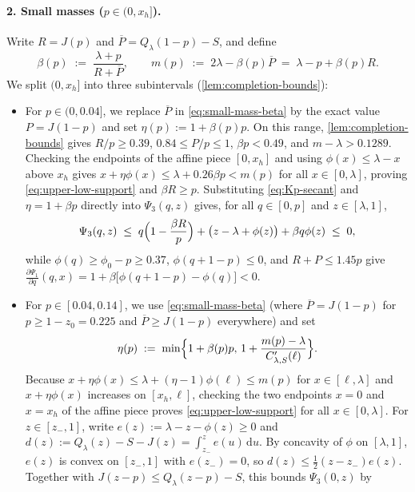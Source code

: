 \documentclass[11pt]{article}
\numberwithin{equation}{section}
\theoremstyle{plain}
\theoremstyle{definition}
\newcommand{\1}{\mathbf{1}}
\begin{document}
\paragraph{2. Small masses ($p \in (0, x_h]$).}
Write $R = J(p)$ and $\overline{P} = Q_\lambda(1 - p) - S$, and define
\begin{equation}
  \beta(p) \;:=\; \frac{\lambda + p}{R + \overline{P}},
  \qquad
  m(p) \;:=\; 2\lambda - \beta(p)\overline{P} \;=\; \lambda - p + \beta(p)R.
  \label{eq:small-mass-beta}
\end{equation}
We split $(0, x_h]$ into three subintervals (\cref{lem:completion-bounds}):
\begin{itemize}
  \item For $p \in (0, 0.04]$, we replace $\overline{P}$ in \cref{eq:small-mass-beta} by the exact value $P = J(1 - p)$ and set $\eta(p) := 1 + \beta(p)p$. On this range, \cref{lem:completion-bounds} gives $R/p \ge 0.39$, $0.84 \le P/p \le 1$, $\beta p < 0.49$, and $m - \lambda > 0.1289$. Checking the endpoints of the affine piece $[0, x_h]$ and using $\phi(x) \le \lambda - x$ above $x_h$ gives $x + \eta\phi(x) \le \lambda + 0.26\beta p < m(p)$ for all $x \in [0, \lambda]$, proving \cref{eq:upper-low-support} and $\beta R \ge p$. Substituting \cref{eq:Kp-secant} and $\eta = 1 + \beta p$ directly into $\Psi_3(q, z)$ gives, for all $q \in [0, p]$ and $z \in [\lambda, 1]$,
  \[
    \Psi_3(q, z) \;\le\; q\Bigl(1 - \frac{\beta R}{p}\Bigr) + \bigl(z - \lambda + \phi(z)\bigr) + \beta q\phi(z) \;\le\; 0,
  \]
  while $\phi(q) \ge \phi_0 - p \ge 0.37$, $\phi(q + 1 - p) \le 0$, and $R + P \le 1.45p$ give $\frac{\partial \Psi_1}{\partial q}(q, x) = 1 + \beta\bigl[\phi(q + 1 - p) - \phi(q)\bigr] < 0$.
  \item For $p \in [0.04, 0.14]$, we use \cref{eq:small-mass-beta} (where $\overline{P} = J(1 - p)$ for $p \ge 1 - z_0 = 0.225$ and $\overline{P} \ge J(1 - p)$ everywhere) and set
  \[
    \eta(p) \;:=\; \min\Bigl\{1 + \beta(p)p,\, 1 + \frac{m(p) - \lambda}{C'_{\lambda, S}(\ell)}\Bigr\}.
  \]
  Because $x + \eta\phi(x) \le \lambda + (\eta - 1)\phi(\ell) \le m(p)$ for $x \in [\ell, \lambda]$ and $x + \eta\phi(x)$ increases on $[x_h, \ell]$, checking the two endpoints $x = 0$ and $x = x_h$ of the affine piece proves \cref{eq:upper-low-support} for all $x \in [0, \lambda]$. For $z \in [z_-, 1]$, write $e(z) := \lambda - z - \phi(z) \ge 0$ and $d(z) := Q_\lambda(z) - S - J(z) = \int_{z_-}^z e(u)\,\mathrm{d}u$. By concavity of $\phi$ on $[\lambda, 1]$, $e(z)$ is convex on $[z_-, 1]$ with $e(z_-) = 0$, so $d(z) \le \frac{1}{2}(z - z_-)e(z)$. Together with $J(z - p) \le Q_\lambda(z - p) - S$, this bounds $\Psi_3(0, z)$ by

\end{itemize}
\end{document}
